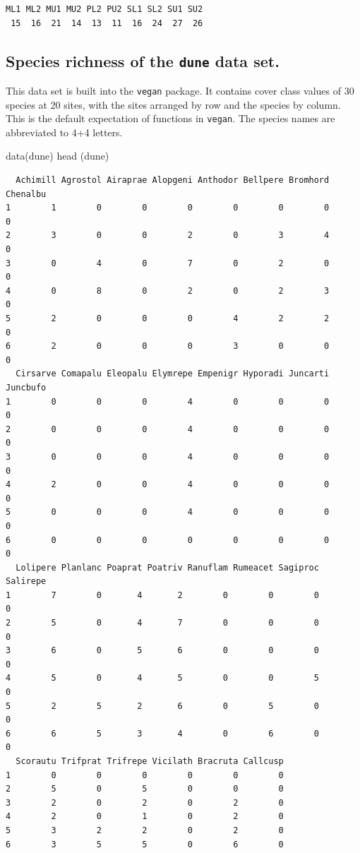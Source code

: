 \documentclass[
  letterpaper,
  DIV=11,
  numbers=noendperiod]{scrreprt}
\newenvironment{Shaded}{\begin{snugshade}}{\end{snugshade}}
\newcommand{\FunctionTok}[1]{\textcolor[rgb]{0.28,0.35,0.67}{#1}}
\newcommand{\NormalTok}[1]{\textcolor[rgb]{0.00,0.23,0.31}{#1}}
\begin{document}
\begin{verbatim}
ML1 ML2 MU1 MU2 PL2 PU2 SL1 SL2 SU1 SU2 
 15  16  21  14  13  11  16  24  27  26 
\end{verbatim}

\subsection{\texorpdfstring{Species richness of the \texttt{dune} data
set.}{Species richness of the dune data set.}}\label{species-richness-of-the-dune-data-set.}

This data set is built into the \texttt{vegan} package. It contains
cover class values of 30 species at 20 sites, with the sites arranged by
row and the species by column. This is the default expectation of
functions in \texttt{vegan}. The species names are abbreviated to 4+4
letters.

\begin{Shaded}
\begin{Highlighting}[]
\FunctionTok{data}\NormalTok{(dune)}
\FunctionTok{head}\NormalTok{ (dune)}
\end{Highlighting}
\end{Shaded}

\begin{verbatim}
  Achimill Agrostol Airaprae Alopgeni Anthodor Bellpere Bromhord Chenalbu
1        1        0        0        0        0        0        0        0
2        3        0        0        2        0        3        4        0
3        0        4        0        7        0        2        0        0
4        0        8        0        2        0        2        3        0
5        2        0        0        0        4        2        2        0
6        2        0        0        0        3        0        0        0
  Cirsarve Comapalu Eleopalu Elymrepe Empenigr Hyporadi Juncarti Juncbufo
1        0        0        0        4        0        0        0        0
2        0        0        0        4        0        0        0        0
3        0        0        0        4        0        0        0        0
4        2        0        0        4        0        0        0        0
5        0        0        0        4        0        0        0        0
6        0        0        0        0        0        0        0        0
  Lolipere Planlanc Poaprat Poatriv Ranuflam Rumeacet Sagiproc Salirepe
1        7        0       4       2        0        0        0        0
2        5        0       4       7        0        0        0        0
3        6        0       5       6        0        0        0        0
4        5        0       4       5        0        0        5        0
5        2        5       2       6        0        5        0        0
6        6        5       3       4        0        6        0        0
  Scorautu Trifprat Trifrepe Vicilath Bracruta Callcusp
1        0        0        0        0        0        0
2        5        0        5        0        0        0
3        2        0        2        0        2        0
4        2        0        1        0        2        0
5        3        2        2        0        2        0
6        3        5        5        0        6        0
\end{verbatim}
\end{document}
